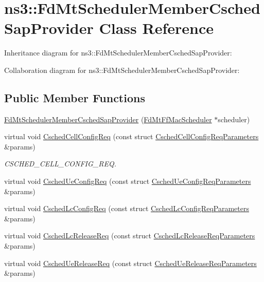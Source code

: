 \hypertarget{classns3_1_1FdMtSchedulerMemberCschedSapProvider}{}\section{ns3\+:\+:Fd\+Mt\+Scheduler\+Member\+Csched\+Sap\+Provider Class Reference}
\label{classns3_1_1FdMtSchedulerMemberCschedSapProvider}


Inheritance diagram for ns3\+:\+:Fd\+Mt\+Scheduler\+Member\+Csched\+Sap\+Provider\+:


Collaboration diagram for ns3\+:\+:Fd\+Mt\+Scheduler\+Member\+Csched\+Sap\+Provider\+:
\subsection*{Public Member Functions}
\begin{DoxyCompactItemize}
\item 
\hyperlink{classns3_1_1FdMtSchedulerMemberCschedSapProvider_a01f4ab4fe95c84f02ac95224219cf25c}{Fd\+Mt\+Scheduler\+Member\+Csched\+Sap\+Provider} (\hyperlink{classns3_1_1FdMtFfMacScheduler}{Fd\+Mt\+Ff\+Mac\+Scheduler} $\ast$scheduler)
\item 
virtual void \hyperlink{classns3_1_1FdMtSchedulerMemberCschedSapProvider_ada1dc2e02ff2e10cd0ba5d6df12e3f02}{Csched\+Cell\+Config\+Req} (const struct \hyperlink{structns3_1_1FfMacCschedSapProvider_1_1CschedCellConfigReqParameters}{Csched\+Cell\+Config\+Req\+Parameters} \&params)
\begin{DoxyCompactList}\small\item\em C\+S\+C\+H\+E\+D\+\_\+\+C\+E\+L\+L\+\_\+\+C\+O\+N\+F\+I\+G\+\_\+\+R\+EQ. \end{DoxyCompactList}\item 
virtual void \hyperlink{classns3_1_1FdMtSchedulerMemberCschedSapProvider_af231c3cd5fd56c3b71389aa4ab0a7882}{Csched\+Ue\+Config\+Req} (const struct \hyperlink{structns3_1_1FfMacCschedSapProvider_1_1CschedUeConfigReqParameters}{Csched\+Ue\+Config\+Req\+Parameters} \&params)
\item 
virtual void \hyperlink{classns3_1_1FdMtSchedulerMemberCschedSapProvider_a1d7dada431837ceb6500b4171f225908}{Csched\+Lc\+Config\+Req} (const struct \hyperlink{structns3_1_1FfMacCschedSapProvider_1_1CschedLcConfigReqParameters}{Csched\+Lc\+Config\+Req\+Parameters} \&params)
\item 
virtual void \hyperlink{classns3_1_1FdMtSchedulerMemberCschedSapProvider_a1f7ac4375758fc9da2b6c2a5eaac618e}{Csched\+Lc\+Release\+Req} (const struct \hyperlink{structns3_1_1FfMacCschedSapProvider_1_1CschedLcReleaseReqParameters}{Csched\+Lc\+Release\+Req\+Parameters} \&params)
\item 
virtual void \hyperlink{classns3_1_1FdMtSchedulerMemberCschedSapProvider_a897d92ba037a29821cefe4272ceaec24}{Csched\+Ue\+Release\+Req} (const struct \hyperlink{structns3_1_1FfMacCschedSapProvider_1_1CschedUeReleaseReqParameters}{Csched\+Ue\+Release\+Req\+Parameters} \&params)
\end{DoxyCompactItemize}
